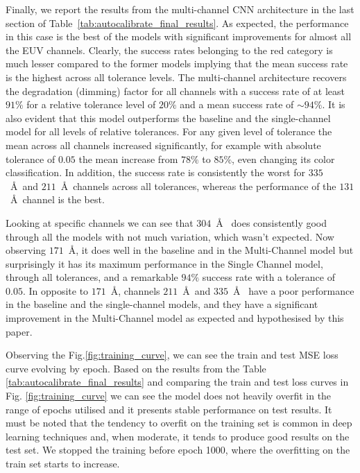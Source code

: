 \documentclass{aa}
\begin{document}
Finally, we report the results from the multi-channel CNN architecture in the last section of Table~\ref{tab:autocalibrate_final_results}. As expected, the performance in this case is the best of the models with significant improvements for almost all the EUV channels. Clearly, the success rates belonging to the red category is much lesser compared to the former models implying that the mean success rate is the highest across all tolerance levels. The multi-channel architecture recovers the degradation (dimming) factor for all channels with a success rate of at least $91\%$ for a relative tolerance level of $20\%$ and a mean success rate of $\sim94\%$. It is also evident that this model outperforms the baseline and the single-channel model for all levels of relative tolerances.  For any given level of tolerance the mean across all channels increased significantly, for example with absolute tolerance of $0.05$ the mean increase from $78\%$ to $85\%$, even changing its color classification. In addition, the success rate is consistently the worst for $335$~\AA~and $211$~\AA~channels across all tolerances, whereas the performance of the $131$~\AA~channel is the best.

Looking at specific channels we can see that $304$~\AA~ does consistently good through all the models with not much variation, which wasn't expected. Now observing $171$~\AA, it does well in the baseline and in the Multi-Channel model but surprisingly it has its maximum performance in the Single Channel model, through all tolerances, and a remarkable $94\%$ success rate with a tolerance of $0.05$. In opposite to $171$~\AA, channels $211$~\AA~and $335$~\AA~ have a poor performance in the baseline and the single-channel models, and they have a significant improvement in the Multi-Channel model as expected and hypothesised by this paper.

Observing the Fig.\ref{fig:training_curve}, we can see the train and test MSE loss curve evolving by epoch. Based on the results from the Table \ref{tab:autocalibrate_final_results} and comparing the train and test loss curves in Fig. \ref{fig:training_curve} we can see the model does not heavily overfit in the range of epochs utilised and it presents stable performance on test results. It must be noted that the tendency to overfit on the training set is common in deep learning techniques and, when moderate, it tends to produce good results on the test set. We stopped the training before epoch 1000, where the overfitting on the train set starts to increase.
\end{document}
